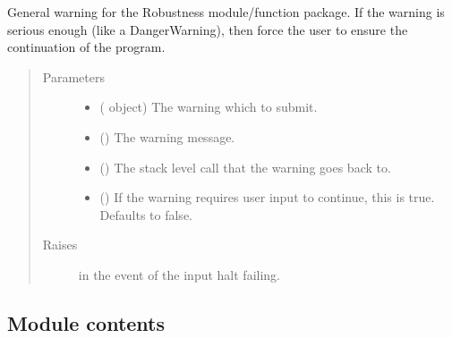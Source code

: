 \documentclass[letterpaper,10pt,english]{sphinxmanual}
\begin{document}
\begin{fulllineitems}
\label{\detokenize{Robustness.warning:Robustness.warning.kyubey_warning}}
General warning for the Robustness module/function package. If the warning
is serious enough (like a DangerWarning), then force the user to ensure
the continuation of the program.
\begin{quote}\begin{description}
\item[{Parameters}] \leavevmode\begin{itemize}
\item {} 
 ( object) \textendash{} The warning which to submit.

\item {} 
 () \textendash{} The warning message.

\item {} 
 () \textendash{} The stack level call that the warning goes back to.

\item {} 
 () \textendash{} If the warning requires user input to continue, this is true. Defaults
to false.

\end{itemize}

\item[{Raises}] \leavevmode
{\hyperref[\detokenize{Robustness.exception:Robustness.exception.TerminateError}]{}} in the event of the input halt failing.

\end{description}\end{quote}

\end{fulllineitems}



\subsection{Module contents}
\label{\detokenize{Robustness:module-Robustness}}\label{\detokenize{Robustness:module-contents}}
\end{document}
